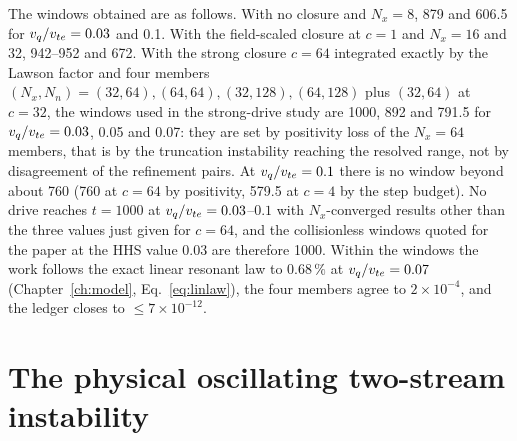 The windows obtained are as follows. With no closure and $N_x=8$, 879 and 606.5 for $v_q/v_{te}=0.03$ and 0.1. With the field-scaled closure at $c=1$ and $N_x=16$ and 32, 942--952 and 672. With the strong closure $c=64$ integrated exactly by the Lawson factor and four members $(N_x,N_n)=(32,64),(64,64),(32,128),(64,128)$ plus $(32,64)$ at $c=32$, the windows used in the strong-drive study are 1000, 892 and 791.5 for $v_q/v_{te}=0.03$, 0.05 and 0.07: they are set by positivity loss of the $N_x=64$ members, that is by the truncation instability reaching the resolved range, not by disagreement of the refinement pairs. At $v_q/v_{te}=0.1$ there is no window beyond about 760 (760 at $c=64$ by positivity, 579.5 at $c=4$ by the step budget). No drive reaches $t=1000$ at $v_q/v_{te}=0.03$--$0.1$ with $N_x$-converged results other than the three values just given for $c=64$, and the collisionless windows quoted for the paper at the HHS value 0.03 are therefore 1000. Within the windows the work follows the exact linear resonant law to $0.68\,\%$ at $v_q/v_{te}=0.07$ (Chapter~\ref{ch:model}, Eq.~\eqref{eq:linlaw}), the four members agree to $2\times10^{-4}$, and the ledger closes to $\le7\times10^{-12}$.

\section{The physical oscillating two-stream instability}\label{sec:otsi}

